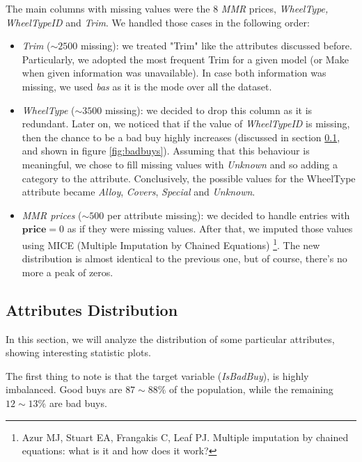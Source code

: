 \documentclass{article}
\begin{document}
	The main columns with missing values were the 8 \emph{MMR} prices, \emph{WheelType, WheelTypeID} and \emph{Trim}.
	We handled those cases in the following order:
	\begin{itemize}
		\item \emph{Trim} ($\sim 2500$ missing): we treated "Trim" like the attributes discussed before. Particularly, we adopted the most frequent Trim for a given model (or Make when given information was unavailable). In case both information was missing, we used \emph{bas} as it is the mode over all the dataset.
		\item \emph{WheelType} ($\sim 3500$ missing): we decided to drop this column as it is redundant. Later on, we noticed that if the value of \emph{WheelTypeID} is missing, then the chance to be a bad buy highly increases (discussed in section \ref{sec:attrDistr}, and shown in figure \ref{fig:badbuys}). Assuming that this behaviour is meaningful, we chose to fill missing values with \emph{Unknown} and so adding a category to the attribute. Conclusively, the possible values for the WheelType attribute became \emph{Alloy}, \emph{Covers}, \emph{Special} and \emph{Unknown}.
		\item \emph{MMR prices} ($\sim 500$ per attribute missing): we decided to handle entries with $\mathbf{price} = 0$ as if they were missing values. After that, we imputed those values using MICE (Multiple Imputation by Chained Equations) \footnote{Azur MJ, Stuart EA, Frangakis C, Leaf PJ. Multiple imputation by chained equations: what is it and how does it work?}. The new distribution is almost identical to the previous one, but of course, there's no more a peak of zeros. 
	\end{itemize}
	
	
	\subsection{Attributes Distribution}
	\label{sec:attrDistr}
	In this section, we will analyze the distribution of some particular attributes, showing interesting statistic plots.
	
	The first thing to note is that the target variable (\emph{IsBadBuy}), is highly imbalanced. Good buys are $87\sim88 \%$ of the population, while the remaining $12\sim13 \%$ are bad buys.
	
\end{document}
